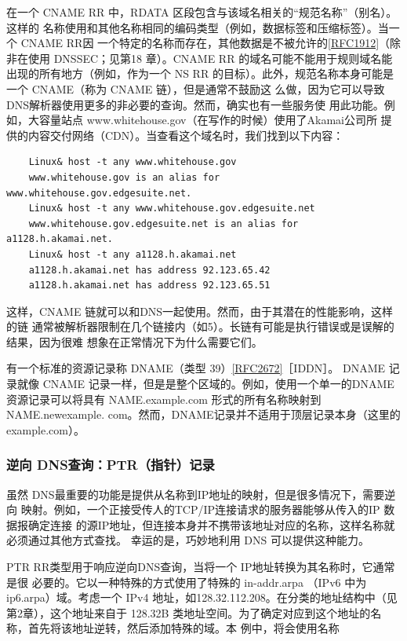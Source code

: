 在一个 CNAME RR 中，RDATA 区段包含与该域名相关的“规范名称”（别名）。这样的
名称使用和其他名称相同的编码类型（例如，数据标签和压缩标签）。当一个 CNAME RR因
一个特定的名称而存在，其他数据是不被允许的\href{https://www.rfc-editor.org/rfc/rfc1912}{[RFC1912]}（除非在使用 DNSSEC；见第18
章）。CNAME RR 的域名可能不能用于规则域名能出现的所有地方（例如，作为一个 NS RR
的目标）。此外，规范名称本身可能是一个 CNAME（称为 CNAME 链），但是通常不鼓励这
么做，因为它可以导致DNS解析器使用更多的非必要的查询。然而，确实也有一些服务使
用此功能。例如，大容量站点 www.whitehouse.gov（在写作的时候）使用了Akamai公司所
提供的内容交付网络（CDN）\footnotemark。当查看这个域名时，我们找到以下内容：

\begin{verbatim}
    Linux& host -t any www.whitehouse.gov
    www.whitehouse.gov is an alias for www.whitehouse.gov.edgesuite.net.
    Linux& host -t any www.whitehouse.gov.edgesuite.net
    www.whitehouse.gov.edgesuite.net is an alias for a1128.h.akamai.net.
    Linux& host -t any a1128.h.akamai.net
    a1128.h.akamai.net has address 92.123.65.42
    a1128.h.akamai.net has address 92.123.65.51
\end{verbatim}

这样，CNAME 链就可以和DNS一起使用。然而，由于其潜在的性能影响，这样的链
通常被解析器限制在几个链接内（如5）。长链有可能是执行错误或是误解的结果，因为很难
想象在正常情况下为什么需要它们。

\begin{tcolorbox}
    有一个标准的资源记录称 DNAME（类型 39）\href{https://www.rfc-editor.org/rfc/rfc2672}{[RFC2672]}［IDDN］。 DNAME
    记录就像 CNAME 记录一样，但是是整个区域的。例如，使用一个单一的DNAME
    资源记录可以将具有 NAME.example.com 形式的所有名称映射到 NAME.newexample.
    com。然而，DNAME记录并不适用于顶层记录本身（这里的 example.com）。
\end{tcolorbox}

\subsubsection{逆向 DNS查询：PTR（指针）记录}

虽然 DNS最重要的功能是提供从名称到IP地址的映射，但是很多情况下，需要逆向
映射。例如，一个正接受传人的TCP/IP连接请求的服务器能够从传入的IP 数据报确定连接
的源IP地址，但连接本身并不携带该地址对应的名称，这样名称就必须通过其他方式查找。
幸运的是，巧妙地利用 DNS 可以提供这种能力。

PTR RR类型用于响应逆向DNS查询，当将一个 IP地址转换为其名称时，它通常是很
必要的。它以一种特殊的方式使用了特殊的 in-addr.arpa （IPv6 中为 ip6.arpa）域。考虑一个
IPv4 地址，如128.32.112.208。在分类的地址结构中（见第2章），这个地址来自于 128.32B
类地址空间。为了确定对应到这个地址的名称，首先将该地址逆转，然后添加特殊的域。本
例中，将会使用名称

